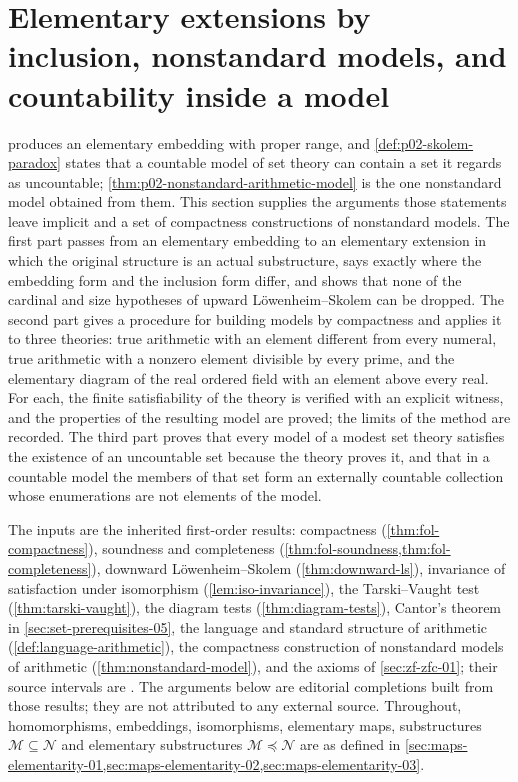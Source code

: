 \section{Elementary extensions by inclusion, nonstandard models, and countability inside a model}
\label{sec:p02-w02-p02-033-inclusion-and-skolem}

 produces an elementary
embedding with proper range, and \cref{def:p02-skolem-paradox} states that a
countable model of set theory can contain a set it regards as uncountable;
\cref{thm:p02-nonstandard-arithmetic-model} is the one nonstandard model
obtained from them.  This section supplies the arguments those statements
leave implicit and a set of compactness constructions of nonstandard models.
The first part passes from an elementary embedding to an elementary extension
in which the original structure is an actual substructure, says exactly where
the embedding form and the inclusion form differ, and shows that none of the
cardinal and size hypotheses of upward L\"owenheim--Skolem can be dropped.
The second part gives a procedure for building models by compactness and
applies it to three theories: true arithmetic with an element different from
every numeral, true arithmetic with a nonzero element divisible by every
prime, and the elementary diagram of the real ordered field with an element
above every real.  For each, the finite satisfiability of the theory is
verified with an explicit witness, and the properties of the resulting
model are proved; the limits of the method are recorded.
The third part proves that every model of a modest set theory satisfies the
existence of an uncountable set because the theory proves it, and that in a
countable model the members of that set form an externally countable
collection whose enumerations are not elements of the model.

The inputs are the inherited first-order results: compactness
(\cref{thm:fol-compactness}), soundness and completeness
(\cref{thm:fol-soundness,thm:fol-completeness}), downward
L\"owenheim--Skolem (\cref{thm:downward-ls}), invariance of satisfaction
under isomorphism (\cref{lem:iso-invariance}), the Tarski--Vaught test
(\cref{thm:tarski-vaught}), the diagram tests (\cref{thm:diagram-tests}),
Cantor's theorem in \cref{sec:set-prerequisites-05}, the language and
standard structure of arithmetic (\cref{def:language-arithmetic}), the
compactness construction of nonstandard models of arithmetic
(\cref{thm:nonstandard-model}), and the axioms of
\cref{sec:zf-zfc-01}; their source intervals are
\cite[lines 533--602, 3519--3680, 3927--4061, 4109--4213, 4713--4967,
5043--5131, 6070--6421, 8306--8438, 9188--9261 and
10089--10271]{FrozenFormalLogicCompactnessApplications}.
The arguments below are editorial completions built from those results; they
are not attributed to any external source.
Throughout, homomorphisms, embeddings, isomorphisms, elementary maps,
substructures \(\mathcal M\subseteq\mathcal N\) and elementary substructures
\(\mathcal M\preccurlyeq\mathcal N\) are as defined in
\cref{sec:maps-elementarity-01,sec:maps-elementarity-02,sec:maps-elementarity-03}.

